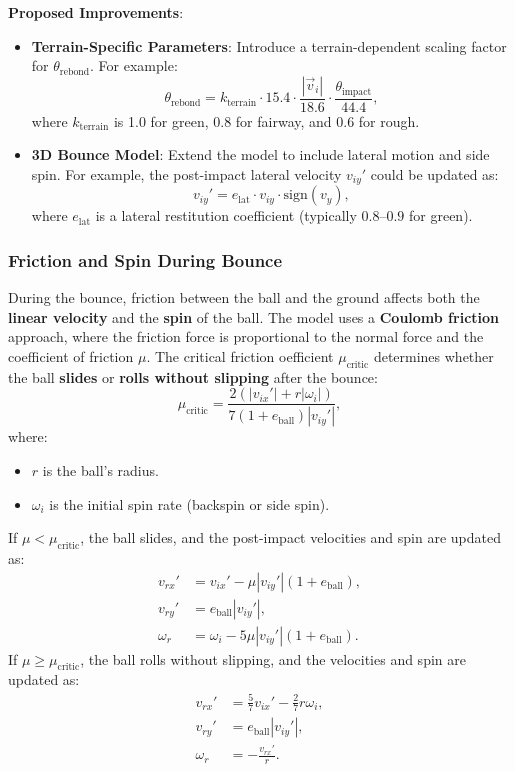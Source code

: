 \documentclass[10pt,a4paper]{report}
\begin{document}
\textbf{Proposed Improvements}:
\begin{itemize}
    \item \textbf{Terrain-Specific Parameters}: Introduce a terrain-dependent 
    scaling factor for $\theta_{\text{rebond}}$. For example:
    \[
    \theta_{\text{rebond}} = k_{\text{terrain}} \cdot 15.4 \cdot 
    \frac{|\vec{v}_i|}{18.6} \cdot \frac{\theta_{\text{impact}}}{44.4},
    \]
    where $k_{\text{terrain}}$ is 1.0 for green, 0.8 for fairway, and 0.6 for rough.
    \item \textbf{3D Bounce Model}: Extend the model to include lateral motion and 
    side spin. For example, the post-impact lateral velocity $v_{iy}'$ could be updated as:
    \[
    v_{iy}' = e_{\text{lat}} \cdot v_{iy} \cdot \text{sign}(v_y),
    \]
    where $e_{\text{lat}}$ is a lateral restitution coefficient (typically $0.8$--$0.9$ for green).
\end{itemize}



\subsubsection{Friction and Spin During Bounce}
\label{subsubsec:friction_spin}

During the bounce, friction between the ball and the ground affects both 
the \textbf{linear velocity} and the \textbf{spin} of the ball. The model 
uses a \textbf{Coulomb friction} approach, where the friction force is proportional 
to the normal force and the coefficient of friction $\mu$. The critical friction
 oefficient $\mu_{\text{critic}}$ determines whether the ball \textbf{slides} 
 or \textbf{rolls without slipping} after the bounce:
\[
\mu_{\text{critic}} = \frac{2 \left(|v_{ix}'| + r |\omega_i|\right)}{7 (1 + e_{\text{ball}}) |v_{iy}'|},
\]
where:
\begin{itemize}
    \item $r$ is the ball's radius.
    \item $\omega_i$ is the initial spin rate (backspin or side spin).
\end{itemize}

If $\mu < \mu_{\text{critic}}$, the ball slides, and the post-impact velocities and spin are updated as:
\[
\begin{aligned}
v_{rx}' &= v_{ix}' - \mu |v_{iy}'| (1 + e_{\text{ball}}), \\
v_{ry}' &= e_{\text{ball}} |v_{iy}'|, \\
\omega_r &= \omega_i - 5 \mu |v_{iy}'| (1 + e_{\text{ball}}).
\end{aligned}
\]
If $\mu \geq \mu_{\text{critic}}$, the ball rolls without slipping, and the velocities and spin are updated as:
\[
\begin{aligned}
v_{rx}' &= \frac{5}{7} v_{ix}' - \frac{2}{7} r \omega_i, \\
v_{ry}' &= e_{\text{ball}} |v_{iy}'|, \\
\omega_r &= -\frac{v_{rx}'}{r}.
\end{aligned}
\]
\end{document}
